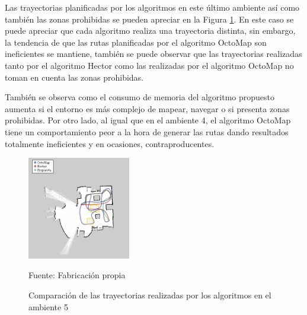 Las trayectorias planificadas por los algoritmos en este último ambiente así como también las zonas prohibidas se pueden apreciar en la Figura \ref{fig:tray_05}. En este caso se puede apreciar que cada algoritmo realiza una trayectoria distinta, sin embargo, la tendencia de que las rutas planificadas por el algoritmo OctoMap son ineficientes se mantiene, también se puede observar que las trayectorias realizadas tanto por el algoritmo Hector como las realizadas por el algoritmo OctoMap no toman en cuenta las zonas prohibidas.

También se observa como el consumo de memoria del algoritmo propuesto aumenta si el entorno es más complejo de mapear, navegar o si presenta zonas prohibidas. Por otro lado, al igual que en el ambiente 4, el algoritmo OctoMap tiene un comportamiento peor a la hora de generar las rutas dando resultados totalmente ineficientes y en ocasiones, contraproducentes.


\begin{figure}[h]
    \centering
    \includegraphics[width=0.4\textwidth]{figures/05experimentacion/r04.png}
    \caption{ Comparación de las trayectorias realizadas por los algoritmos en el ambiente 5} 
    \label{fig:tray_05}
    Fuente: Fabricación propia
\end{figure}

